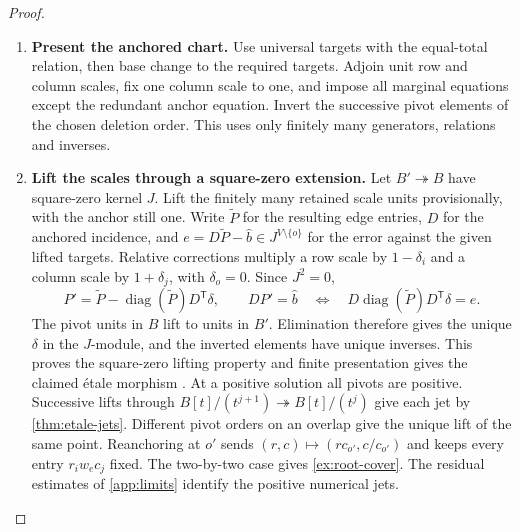 \documentclass[11pt,a4paper]{article}
\theoremstyle{definition}
\theoremstyle{remark}\newaliascnt{remark}{theorem}
\numberwithin{equation}{section}
\begin{document}
\begin{proof}\leavevmode
\begin{enumerate}[titledsteps]
    \item \textbf{Present the anchored chart.} Use universal targets with the equal-total relation, then base change to the required targets. Adjoin unit row and column scales, fix one column scale to one, and impose all marginal equations except the redundant anchor equation. Invert the successive pivot elements of the chosen deletion order. This uses only finitely many generators, relations and inverses.


    \item \textbf{Lift the scales through a square-zero extension.} Let \(B'\twoheadrightarrow B\) have square-zero kernel \(J\). Lift the finitely many retained scale units provisionally, with the anchor still one. Write \(\widetilde P\) for the resulting edge entries, \(D\) for the anchored incidence, and \(e=D\widetilde P-\widehat b\in J^{V\setminus\{o\}}\) for the error against the given lifted targets. Relative corrections multiply a row scale by \(1-\delta_i\) and a column scale by \(1+\delta_j\), with \(\delta_o=0\). Since \(J^2=0\),
\[
 P'=\widetilde P-\operatorname{diag}(\widetilde P)D^{\mathsf T}\delta,\qquad
 DP'=\widehat b
 \quad\Longleftrightarrow\quad
 D\operatorname{diag}(\widetilde P)D^{\mathsf T}\delta=e .
\]
The pivot units in \(B\) lift to units in \(B'\). Elimination therefore gives the unique \(\delta\) in the \(J\)-module, and the inverted elements have unique inverses. This proves the square-zero lifting property and finite presentation gives the claimed \'etale morphism \cite{etale}. At a positive solution all pivots are positive. Successive lifts through \(B[t]/(t^{j+1})\twoheadrightarrow B[t]/(t^j)\) give each jet by \cref{thm:etale-jets}. Different pivot orders on an overlap give the unique lift of the same point. Reanchoring at \(o'\) sends \((r,c)\mapsto(r c_{o'},c/c_{o'})\) and keeps every entry \(r_i w_e c_j\) fixed. The two-by-two case gives \cref{ex:root-cover}. The residual estimates of \cref{app:limits} identify the positive numerical jets.\qedhere
\end{enumerate}
\end{proof}
\end{document}
